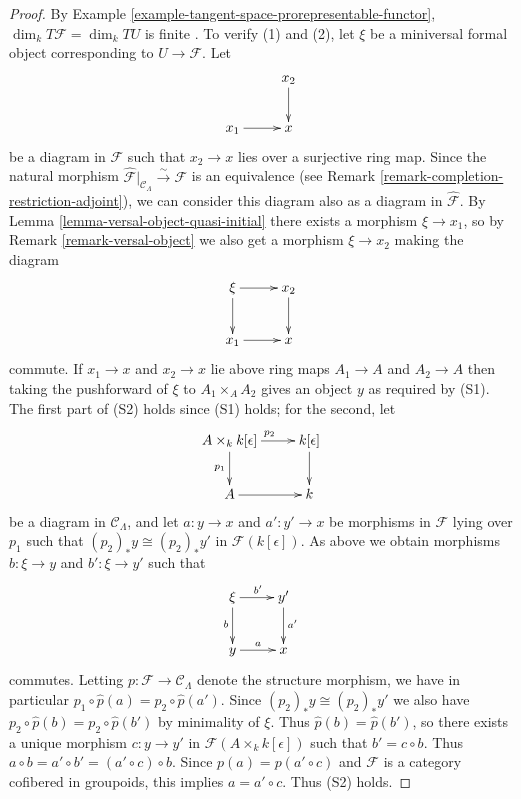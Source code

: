 \begin{proof}
By Example \ref{example-tangent-space-prorepresentable-functor}, $\dim_{k} 
T\mathcal{F} = \dim_{k} TU$ is finite . To verify (1) and (2), let $\xi$ be a 
miniversal formal object corresponding to $U \to \mathcal{F}$. Let 
\[
\xymatrix{
           & x_2 \ar[d] \\
x_1 \ar[r] & x   
}
\]
be a diagram in $\mathcal{F}$ such that $x_2 \to x$ lies over a 
surjective ring map. Since the natural morphism $\widehat{\mathcal 
F}|_{\mathcal{C}_\Lambda} \xrightarrow{\sim} \mathcal{F}$ is an equivalence 
(see Remark \ref{remark-completion-restriction-adjoint}), we can consider this 
diagram also as a diagram in $\widehat{\mathcal{F}}$.  By Lemma 
\ref{lemma-versal-object-quasi-initial} there exists a morphism $\xi 
\to x_1$, so by Remark \ref{remark-versal-object} we also get a 
morphism $\xi \to x_2$ making the diagram
\[
\xymatrix{
\xi \ar[r] \ar[d]          & x_2 \ar[d] \\
x_1 \ar[r] & x   
}
\]
commute.  If $x_1 \to x$ and $x_2 \to x$ lie above ring maps 
$A_1 \to A$ and $A_2 \to A$ then taking the pushforward of 
$\xi$ to $A_1 \times_{A} A_2$ gives an object $y$ as required by (S1). The 
first part of (S2) holds since (S1) holds; for the second, let \[
\xymatrix{
A \times_{k} k[\epsilon]  \ar[r]^{p_2} \ar[d]_{p_1}  & k[\epsilon] \ar[d] 
\\
A  \ar[r] & k 
}
\]  
be a diagram in $\mathcal{C}_\Lambda$, and let $a: y \to x$ and $a': 
y' \to x$ be morphisms in $\mathcal{F}$ lying over $p_{1}$ such that 
$(p_2)_{*}y \cong (p_2)_{*}y'$ in $\mathcal{F}(k[\epsilon])$.  As above we 
obtain morphisms $b: \xi \to y$ and $b': \xi \to y'$ such that
\[
\xymatrix{
\xi \ar[r]^{b'} \ar[d]_{b}          & y' \ar[d]^{a'} \\
y \ar[r]^{a} & x   
}
\]
commutes.  Letting $p: \mathcal{F} \to \mathcal{C}_\Lambda$ denote the 
structure morphism, we have in particular $p_1 \circ \widehat{p}(a) = p_2 \circ 
\widehat{p}(a')$.  Since $(p_2)_{*}y \cong (p_2)_{*}y'$ we also have $p_2 \circ 
\widehat{p}(b) = p_2 \circ \widehat{p}(b')$ by minimality of $\xi$.  Thus 
$\widehat{p}(b) = \widehat{p}(b')$, so there exists a unique morphism $c: y 
\to y'$ in $\mathcal{F}(A \times_{k} k[\epsilon])$ such that $b' = c 
\circ b$.  Thus $a \circ b = a' \circ b' = (a' \circ c) \circ b$.  Since $p(a) 
= p(a' \circ c)$ and $\mathcal{F}$ is a category cofibered in groupoids, this 
implies $a = a' \circ c$.  Thus (S2) holds.
\end{proof}

